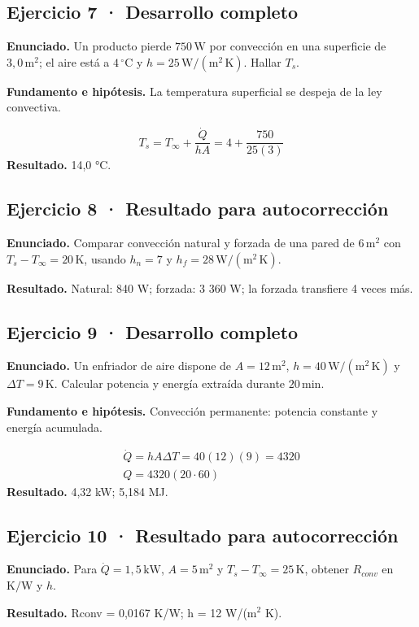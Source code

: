 \documentclass[11pt,a4paper]{article}
\begin{document}
\subsection*{Ejercicio 7 · Desarrollo completo}
\textbf{Enunciado.} Un producto pierde \(750\,\mathrm W\) por convección en una superficie de \(3{,}0\,\mathrm m^2\); el aire está a \(4\,^\circ\mathrm C\) y \(h=25\,\mathrm{W/(m^2\,K)}\). Hallar \(T_s\).

\textbf{Fundamento e hipótesis.} La temperatura superficial se despeja de la ley convectiva.

\[
T_s=T_\infty+\frac{\dot Q}{hA}=4+\frac{750}{25(3)}
\]
\textbf{Resultado.} 14,0 °C.


\subsection*{Ejercicio 8 · Resultado para autocorrección}
\textbf{Enunciado.} Comparar convección natural y forzada de una pared de \(6\,\mathrm m^2\) con \(T_s-T_\infty=20\,\mathrm K\), usando \(h_n=7\) y \(h_f=28\,\mathrm{W/(m^2\,K)}\).

\textbf{Resultado.} Natural: 840 W; forzada: 3 360 W; la forzada transfiere 4 veces más.


\subsection*{Ejercicio 9 · Desarrollo completo}
\textbf{Enunciado.} Un enfriador de aire dispone de \(A=12\,\mathrm m^2\), \(h=40\,\mathrm{W/(m^2\,K)}\) y \(\Delta T=9\,\mathrm K\). Calcular potencia y energía extraída durante \(20\,\mathrm{min}\).

\textbf{Fundamento e hipótesis.} Convección permanente: potencia constante y energía acumulada.

\[
\begin{gathered}
\dot Q=hA\Delta T=40(12)(9)=4320\\Q=4320(20\cdot60)
\end{gathered}
\]
\textbf{Resultado.} 4,32 kW; 5,184 MJ.


\subsection*{Ejercicio 10 · Resultado para autocorrección}
\textbf{Enunciado.} Para \(\dot Q=1{,}5\,\mathrm{kW}\), \(A=5\,\mathrm m^2\) y \(T_s-T_\infty=25\,\mathrm K\), obtener \(R_{conv}\) en \(\mathrm{K/W}\) y \(h\).

\textbf{Resultado.} Rconv = 0,0167 K/W; h = 12 W/(m\ensuremath{^2} K).
\end{document}

